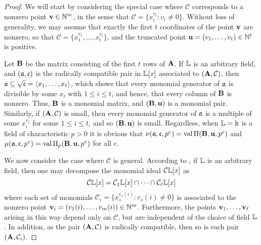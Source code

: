 \documentclass{amsart}
\begin{document}
\begin{proof}  
We will start by considering the special case where $\mathcal{C}$ corresponds to a nonzero point $\mathbf{v} \in \mathbb{N}^m$, in the sense that $\mathcal{C} = \{ x_i^{v_i} : v_i \neq 0 \}$. Without loss of generality, we may assume that exactly the first $t$ coordinates of the point $\mathbf{v}$ are nonzero, so that $\mathcal{C} = \{x_1^{v_1}, \ldots, x_t^{v_t}\}$, and the truncated point ${\mathbf{u}} = (v_1, \ldots, v_t) \in \mathbb{N}^t$ is positive.  

Let $\mathbf{B}$ be the matrix consisting of the first $t$ rows of $\mathbf{A}$.  If $\mathbb{L}$ is an arbitrary field, and $(\mathfrak{a}, \mathfrak{c})$ is the radically compatible pair in $\mathbb{L}[x]$ associated to $(\mathbf{A}, \mathcal{C})$, then $\mathfrak{a} \subseteq \sqrt {\mathfrak{c}} = \langle x_1, \ldots, x_t \rangle$, which shows that every monomial generator of $\mathfrak{a}$ is divisible by some $x_i$ with $1 \leq i \leq t$, and hence, that every column of $\mathbf{B}$ is nonzero. Thus,  $\mathbf{B}$ is a monomial matrix, and $(\mathbf{B}, {\mathbf{u}})$ is a monomial pair.
Similarly, if $(\mathbf{A}, \mathcal{C})$ is small, then every monomial generator of $\mathfrak{a}$ is a multiple of some $x_i^{v_i}$ for some $1 \leq i \leq t$, and so $(\mathbf{B}, \mathbf{u})$ is small.  Regardless, when $\mathbb{L}=\Bbbk$ is a field of characteristic $p>0$ it is obvious that $\nu(\mathfrak{a}, \mathfrak{c}, p^e) = \operatorname{val} \Pi (\mathbf{B}, \mathbf{u}, p^e)$ and $\mu(\mathfrak{a}, \mathfrak{c}, p^e) = \operatorname{val} \Pi_p(\mathbf{B}, \mathbf{u}, p^e)$ for all $e$.

We now consider the case where $\mathcal{C}$ is general.   According to \cite[Lemma 5.18]{miller+sturmfels.combinatorial_CA},  if $\mathbb{L}$ is an arbitrary field, then one may decompose the monomial ideal $\mathcal{C} \mathbb{L}[x]$ as
%
\begin{equation}
\label{irreducible-decomposition: e}
 \mathcal{C} \mathbb{L}[x] = \mathcal{C}_1 \mathbb{L}[x] \cap \cdots \cap \mathcal{C}_{\ell} \mathbb{L}[x]
 \end{equation}
%
where each set of monomials $\mathcal{C}_i = \{ x_s^{v_s(i)} : v_s(i) \neq 0 \}$ is associated to the nonzero point $\mathbf{v}_i = (v_1(i), \ldots, v_m(i)) \in \mathbb{N}^m$. Furthermore, the points $\mathbf{v}_1, \ldots, \mathbf{v}_{\ell}$ arising in this way depend only on $\mathcal{C}$, but are independent of the choice of field $\mathbb{L}$.  In addition, as the pair $(\mathbf{A}, \mathcal{C})$ is radically compatible, then so is each pair $(\mathbf{A}, \mathcal{C}_i)$.


\end{proof}
\end{document}
